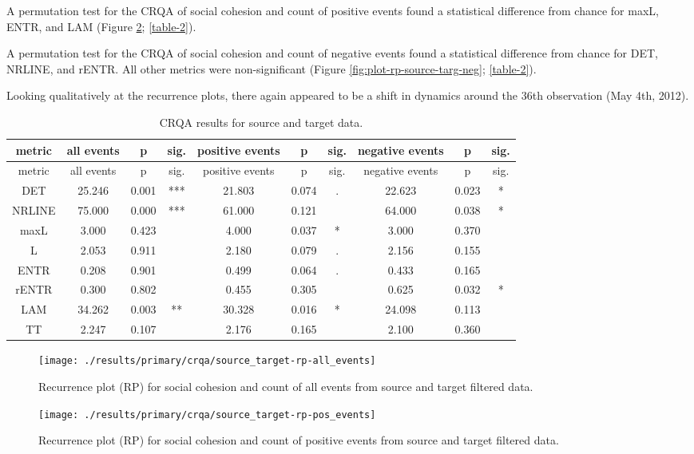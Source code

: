 \documentclass[
  english,
  man]{apa6}
\begin{document}
A permutation test for the CRQA of social cohesion and count of positive events
found a statistical difference from chance for maxL, ENTR, and LAM (Figure
\ref{fig:plot-rp-source-targ-pos}; \autoref{table-2}).

A permutation test for the CRQA of social cohesion and count of negative events
found a statistical difference from chance for DET, NRLINE, and rENTR. All other
metrics were non-significant (Figure \ref{fig:plot-rp-source-targ-neg};
\autoref{table-2}).

Looking qualitatively at the recurrence plots, there again appeared to be a
shift in dynamics around the 36th observation (May 4th, 2012).

\begin{longtable}[]{@{}cccccccccc@{}}
\caption{\label{table-2}CRQA results for source and target data.}\tabularnewline
\toprule
metric & all events & p & sig. & positive events & p & sig. & negative events & p & sig.\tabularnewline
\midrule
\endfirsthead
\toprule
metric & all events & p & sig. & positive events & p & sig. & negative events & p & sig.\tabularnewline
\midrule
\endhead
DET & 25.246 & 0.001 & *** & 21.803 & 0.074 & . & 22.623 & 0.023 & *\tabularnewline
NRLINE & 75.000 & 0.000 & *** & 61.000 & 0.121 & & 64.000 & 0.038 & *\tabularnewline
maxL & 3.000 & 0.423 & & 4.000 & 0.037 & * & 3.000 & 0.370 &\tabularnewline
L & 2.053 & 0.911 & & 2.180 & 0.079 & . & 2.156 & 0.155 &\tabularnewline
ENTR & 0.208 & 0.901 & & 0.499 & 0.064 & . & 0.433 & 0.165 &\tabularnewline
rENTR & 0.300 & 0.802 & & 0.455 & 0.305 & & 0.625 & 0.032 & *\tabularnewline
LAM & 34.262 & 0.003 & ** & 30.328 & 0.016 & * & 24.098 & 0.113 &\tabularnewline
TT & 2.247 & 0.107 & & 2.176 & 0.165 & & 2.100 & 0.360 &\tabularnewline
\bottomrule
\end{longtable}

\begin{figure}
\texttt{[image: ./results/primary/crqa/source\_target-rp-all\_events]} \caption{Recurrence plot (RP) for social cohesion and count of all events from source and target filtered data.}\label{fig:plot-rp-source-targ-all}
\end{figure}

\begin{figure}
\texttt{[image: ./results/primary/crqa/source\_target-rp-pos\_events]} \caption{Recurrence plot (RP) for social cohesion and count of positive events from source and target filtered data.}\label{fig:plot-rp-source-targ-pos}
\end{figure}
\end{document}
